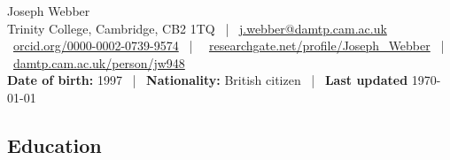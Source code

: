 \documentclass[a4paper]{article}
\begin{document}
	\vspace{1em}

    \begin{center}
        \Huge{Joseph Webber} \\
        \vspace{0.75em}
        \normalsize
        Trinity College, Cambridge, CB2 1TQ \, | \, \href{mailto:j.webber@damtp.cam.ac.uk}{j.webber@damtp.cam.ac.uk}  \\ \vspace{0.1em}
        \faOrcid\, \href{https://orcid.org/0000-0002-0739-9574}{orcid.org/0000-0002-0739-9574} \, | \, \faResearchgate\, \href{https://www.researchgate.net/profile/Joseph_Webber}{researchgate.net/profile/Joseph\_Webber} \, | \, \faGlobe\, \href{https://www.damtp.cam.ac.uk/person/jw948}{damtp.cam.ac.uk/person/jw948}  \\
        \vspace{0.1em}
        \textbf{Date of birth:} 1997 \, | \, \textbf{Nationality:} British citizen \, | \, \textbf{Last updated} \today
    \end{center}


    \subsection*{Education}
\end{document}
